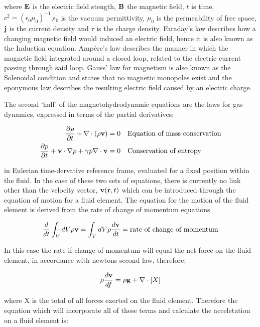 where $\mathbf{E}$ is the electric field stength, $\mathbf{B}$ the magnetic field, $t$ is time, $c^2 = (\epsilon_0\mu_0)^{-1}$,$\epsilon_0$ is the vacuum permittivity, $\mu_0$ is the permeability of free space, $\mathbf{j}$ is the current density and $\tau$ is the charge density.
Faraday's law describes how a changing magnetic field would induced an electric field, hence it is also known as the Induction equation.
Amp{\`e}re's law describes the manner in which the magnetic field integrated around a closed loop, related to the electric current passing through said loop.
Gauss' law for magnetism is also known as the Solenoidal condition and states that no magnetic monopoles exist and the eponymous law describes the resulting electric field caused by an electric charge.

The second `half' of the magnetohydrodynamic equations are the laws for gas dynamics, expressed in terms of the partial derivatives:

\begin{align}
	\frac{\partial \rho}{\partial t } + \nabla \cdot (\rho\mathbf{v}) = 0 & \quad\textnormal{Equation of mass conservation}\\
	\frac{\partial p}{\partial t } + \mathbf{v}\cdot\nabla p + \gamma p\nabla\cdot\mathbf{v} = 0 & \quad \textnormal{Conservation of entropy}
\end{align}

in Eulerian time-dervative reference frame, evaluated for a fixed position within the fluid.
In the case of these two sets of equations, there is currently no link other than the velocity vector, $\mathbf{v}(\mathbf{r},t)$ which can be introduced through the equation of motion for a fluid element.
The equation for the motion of the fluid element is derived from the rate of change of momentum equations 

\begin{equation}
	\frac{d}{dt} \int_{V}^{}dV\rho\mathbf{v} = \int_{V}^{}dV\rho\frac{d \mathbf{v}}{d t } = \textnormal{rate of change of momentum}
\end{equation}

In this case the rate if change of momentum will equal the net force on the fluid element, in accordance with newtons second law, therefore;

\begin{equation}
	\rho \frac{d \mathbf{v}}{d f } = \rho\mathbf{g} + \nabla\cdot[X]
\end{equation}

where X is the total of all forces exerted on the fluid element. 
Therefore the equation which will incorporate all of these terms and calculate the acceletation on a fluid element is:

